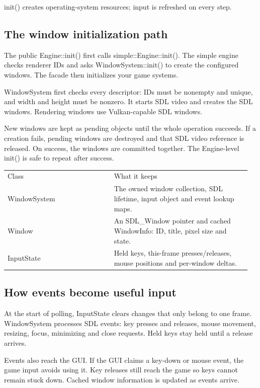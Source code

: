 \documentclass[11pt,a4paper]{article}
\begin{document}
\label{core-27}
init() creates operating-system resources; input is refreshed on every step.

\subsection*{The window initialization path}
The public Engine::init() first calls simple::Engine::init(). The simple engine checks renderer IDs and asks WindowSystem::init() to create the configured windows. The facade then initializes your game systems.

WindowSystem first checks every descriptor: IDs must be nonempty and unique, and width and height must be nonzero. It starts SDL video and creates the SDL windows. Rendering windows use Vulkan-capable SDL windows.

New windows are kept as pending objects until the whole operation succeeds. If a creation fails, pending windows are destroyed and that SDL video reference is released. On success, the windows are committed together. The Engine-level init() is safe to repeat after success.

{\small
\begin{longtable}{@{}p{0.42\linewidth}p{0.54\linewidth}@{}}
Class & What it keeps \\
WindowSystem & The owned window collection, SDL lifetime, input object and event lookup maps. \\
Window & An SDL\_Window pointer and cached WindowInfo: ID, title, pixel size and state. \\
InputState & Held keys, this-frame presses/releases, mouse positions and per-window deltas. \\
\end{longtable}
}

\subsection*{How events become useful input}
At the start of polling, InputState clears changes that only belong to one frame. WindowSystem processes SDL events: key presses and releases, mouse movement, resizing, focus, minimizing and close requests. Held keys stay held until a release arrives.

Events also reach the GUI. If the GUI claims a key-down or mouse event, the game input avoids using it. Key releases still reach the game so keys cannot remain stuck down. Cached window information is updated as events arrive.
\end{document}
